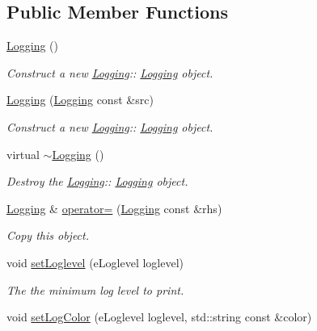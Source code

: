 \subsection*{Public Member Functions}
\begin{DoxyCompactItemize}
\item 
\mbox{\label{class_logging_acc3d848a3d05076fd185cd95e9c648d5}} 
\hyperlink{class_logging_acc3d848a3d05076fd185cd95e9c648d5}{Logging} ()
\begin{DoxyCompactList}\small\item\em Construct a new \hyperlink{class_logging}{Logging}\+:\+: \hyperlink{class_logging}{Logging} object. \end{DoxyCompactList}\item 
\hyperlink{class_logging_a4edcd4fdedc39eaff3bdb62e2d485f8f}{Logging} (\hyperlink{class_logging}{Logging} const \&src)
\begin{DoxyCompactList}\small\item\em Construct a new \hyperlink{class_logging}{Logging}\+:\+: \hyperlink{class_logging}{Logging} object. \end{DoxyCompactList}\item 
\mbox{\label{class_logging_af6a0971121f5b0d9d6ebfb4e69b20a4d}} 
virtual \hyperlink{class_logging_af6a0971121f5b0d9d6ebfb4e69b20a4d}{$\sim$\+Logging} ()
\begin{DoxyCompactList}\small\item\em Destroy the \hyperlink{class_logging}{Logging}\+:\+: \hyperlink{class_logging}{Logging} object. \end{DoxyCompactList}\item 
\hyperlink{class_logging}{Logging} \& \hyperlink{class_logging_a4cfa3d5bc28693dc9bf36e9eb55fe824}{operator=} (\hyperlink{class_logging}{Logging} const \&rhs)
\begin{DoxyCompactList}\small\item\em Copy this object. \end{DoxyCompactList}\item 
void \hyperlink{class_logging_a5165a7c0ff67c0cd90e651af28e6a65f}{set\+Loglevel} (e\+Loglevel loglevel)
\begin{DoxyCompactList}\small\item\em The the minimum log level to print. \end{DoxyCompactList}\item 
void \hyperlink{class_logging_a8f4283898adff3dd6cf1653b2f9dd9cb}{set\+Log\+Color} (e\+Loglevel loglevel, std\+::string const \&color)

\end{DoxyCompactItemize}
